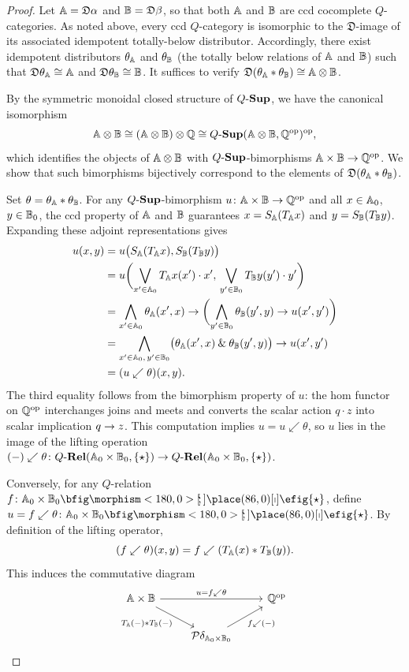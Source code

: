 \documentclass{tac}
\begin{document}
\begin{proof}
Let $\mathbb{A}=\mathfrak{D}\alpha$ and $\mathbb{B}=\mathfrak{D}\beta$, so that both $\mathbb{A}$ and $\mathbb{B}$ are ccd cocomplete $Q$-categories. As noted above, every ccd $Q$-category is isomorphic to the $\mathfrak{D}$-image of its associated idempotent totally-below distributor. Accordingly, there exist idempotent distributors $\theta_{\mathbb{A}}$ and $\theta_{\mathbb{B}}$ (the totally below relations of $\mathbb{A}$ and $\mathbb{B}$) such that $\mathfrak{D}\theta_{\mathbb{A}}\cong\mathbb{A}$ and $\mathfrak{D}\theta_{\mathbb{B}}\cong\mathbb{B}$. It suffices to verify $\mathfrak{D}(\theta_{\mathbb{A}}*\theta_{\mathbb{B}})\cong\mathbb{A}\otimes\mathbb{B}$.

By the symmetric monoidal closed structure of ${Q\text{-}\mathbf{Sup}}$, we have the canonical isomorphism
\[
\mathbb{A}\otimes\mathbb{B}\cong(\mathbb{A}\otimes\mathbb{B})\otimes \mathbb{Q}\cong{Q\text{-}\mathbf{Sup}}(\mathbb{A}\otimes\mathbb{B},\mathbb{Q}^{\mathrm{op}})^{\mathrm{op}},
\]
which identifies the objects of $\mathbb{A}\otimes\mathbb{B}$ with ${Q\text{-}\mathbf{Sup}}$-bimorphisms $\mathbb{A}\times\mathbb{B}\to\mathbb{Q}^{\mathrm{op}}$. We show that such bimorphisms bijectively correspond to the elements of $\mathfrak{D}(\theta_{\mathbb{A}}*\theta_{\mathbb{B}})$.

Set $\theta=\theta_{\mathbb{A}}*\theta_{\mathbb{B}}$. For any ${Q\text{-}\mathbf{Sup}}$-bimorphism $u\colon\mathbb{A}\times\mathbb{B}\to \mathbb{Q}^{\mathrm{op}}$ and all $x\in\mathbb{A}_0$, $y\in\mathbb{B}_0$, the ccd property of $\mathbb{A}$ and $\mathbb{B}$ guarantees $x=S_{\mathbb{A}}(T_{\mathbb{A}}x)$ and $y=S_{\mathbb{B}}(T_{\mathbb{B}}y)$. Expanding these adjoint representations gives
\begin{align*}
u(x,y)&=u\bigl(S_{\mathbb{A}}(T_{\mathbb{A}}x),S_{\mathbb{B}}(T_{\mathbb{B}}y)\bigr)\\
&=u\biggl(\bigvee_{x'\in\mathbb{A}_0}T_{\mathbb{A}}x(x')\cdot x',\,
\bigvee_{y'\in\mathbb{B}_0}T_{\mathbb{B}}y(y')\cdot y'\biggr)\\
&=\bigwedge_{x'\in\mathbb{A}_0}\theta_{\mathbb{A}}(x',x)\rightarrow
\biggl(\bigwedge_{y'\in\mathbb{B}_0}\theta_{\mathbb{B}}(y',y)\rightarrow u(x',y')\biggr)\\
&=\bigwedge_{x'\in\mathbb{A}_0,\,y'\in\mathbb{B}_0}
\bigl(\theta_{\mathbb{A}}(x',x)\mathbin{\&}\theta_{\mathbb{B}}(y',y)\bigr)\rightarrow u(x',y')\\
&=(u\swarrow\theta)(x,y).
\end{align*}
The third equality follows from the bimorphism property of $u$: the hom functor on $\mathbb{Q}^{\mathrm{op}}$ interchanges joins and meets and converts the scalar action $q\cdot z$ into scalar implication $q\rightarrow z$. This computation implies $u=u\swarrow\theta$, so $u$ lies in the image of the lifting operation $(-)\swarrow\theta\colon Q\text{-}\mathbf{Rel}(\mathbb{A}_0\times\mathbb{B}_0,{\{\star\}})\to Q\text{-}\mathbf{Rel}(\mathbb{A}_0\times\mathbb{B}_0,{\{\star\}})$.

Conversely, for any $Q$-relation $f\colon\bbA_0\times\bbB_0\nto\sigt$, define $u=f\swarrow\theta\colon\bbA_0\times\bbB_0\nto\sigt$. By definition of the lifting operator,
\[
(f\swarrow\theta)(x,y)=f\swarrow(T_{\mathbb{A}}(x)\ast T_{\mathbb{B}}(y)).
\]
This induces the commutative diagram
\[
\begin{tikzcd}
\bbA\times\bbB
\arrow{rr}{u=f\swarrow\theta} \arrow{dr}[swap]{T_{\bbA}(-)*T_{\bbB}(-)} &&
\bbQ^{\op} \\
&\mathcal{P}\delta_{\bbA_0\times\bbB_0}
\arrow{ur}[swap]{f\swarrow(-)} &
\end{tikzcd}
\]


\end{proof}
\end{document}
